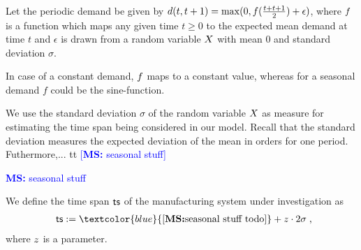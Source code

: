 \documentclass[mnsc]{informs3}
\newcommand\MS[2][r]{\ifx t#1 \textcolor{blue}{[\textbf{MS:} #2]}
  \else \begin{center}\textcolor{blue}{\textbf{MS:} #2} \end{center} \fi}
\begin{document}
Let the periodic demand be given by ${d}(t,t+1) = \max(0,{f}(\frac{t+t+1}{2}) + \epsilon)$,
where ${f}$ is a function which maps any given time $t \geqslant 0$ to the expected mean demand
at time $t$ and $\epsilon$ is drawn from a random variable $X$ with mean $0$ and standard deviation
$\sigma$.

\begin{example}
  In case of a constant demand, ${f}$ maps to a constant value, whereas for a seasonal demand $f$
  could be the sine-function.
\end{example}


We use the standard deviation $\sigma$ of the random variable $X$ as measure for estimating the
time span being considered in our model. Recall that the standard deviation measures the expected
deviation of the mean in orders for one period.
%
Futhermore,... \MS[t]{seasonal stuff}
%

\begin{definition}
  We define the time span $\mathsf{ts}$ of the manufacturing system under investigation as
  \begin{align*}
    \ts \defsym \MS[t]{\text{seasonal stuff todo}} + \z \cdot 2 \sigma \tcom
  \end{align*}
  where $z$ is a parameter.
\end{definition}
\end{document}
